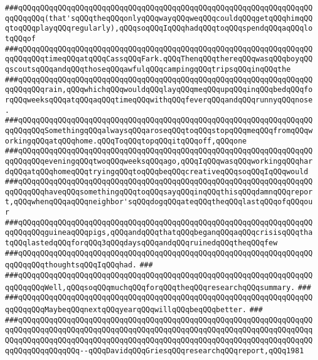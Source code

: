 \verb|###qQQqqQQqqQQqqQQqqQQqqQQqqQQqqQQqqQQqqQQqqQQqqQQqqQQqqQQqqQQqqQQqqQQqqQQqqQQq(that'sqQQqtheqQQqonlyqQQqwayqQQqweqQQqcouldqQQqgetqQQqhimqQQqtoqQQqplayqQQqregularly),qQQqsoqQQqIqQQqhadqQQqtoqQQqspendqQQqaqQQqlotqQQqof|\newline
\verb|###qQQqqQQqqQQqqQQqqQQqqQQqqQQqqQQqqQQqqQQqqQQqqQQqqQQqqQQqqQQqqQQqqQQqqQQqqQQqtimeqQQqatqQQqCassqQQqFark.qQQqThenqQQqthereqQQqwasqQQqboyqQQqscoutsqQQqandqQQqthoseqQQqawfulqQQqcampingqQQqtripsqQQqinqQQqthe|\newline
\verb|###qQQqqQQqqQQqqQQqqQQqqQQqqQQqqQQqqQQqqQQqqQQqqQQqqQQqqQQqqQQqqQQqqQQqqQQqqQQqrain,qQQqwhichqQQqwouldqQQqlayqQQqmeqQQqupqQQqinqQQqbedqQQqforqQQqweeksqQQqatqQQqaqQQqtimeqQQqwithqQQqfeverqQQqandqQQqrunnyqQQqnose.|\newline
\verb|###qQQqqQQqqQQqqQQqqQQqqQQqqQQqqQQqqQQqqQQqqQQqqQQqqQQqqQQqqQQqqQQqqQQqqQQqqQQqSomethingqQQqalwaysqQQqaroseqQQqtoqQQqstopqQQqmeqQQqfromqQQqworkingqQQqatqQQqhome.qQQqToqQQqtopqQQqitqQQqoff,qQQqone|\newline
\verb|###qQQqqQQqqQQqqQQqqQQqqQQqqQQqqQQqqQQqqQQqqQQqqQQqqQQqqQQqqQQqqQQqqQQqqQQqqQQqeveningqQQqtwoqQQqweeksqQQqago,qQQqIqQQqwasqQQqworkingqQQqhardqQQqatqQQqhomeqQQqtryingqQQqtoqQQqbeqQQqcreativeqQQqsoqQQqIqQQqwould|\newline
\verb|###qQQqqQQqqQQqqQQqqQQqqQQqqQQqqQQqqQQqqQQqqQQqqQQqqQQqqQQqqQQqqQQqqQQqqQQqqQQqhaveqQQqsomethingqQQqtoqQQqsayqQQqinqQQqthisqQQqdamnqQQqreport,qQQqwhenqQQqaqQQqneighbor'sqQQqdogqQQqateqQQqtheqQQqlastqQQqofqQQqour|\newline
\verb|###qQQqqQQqqQQqqQQqqQQqqQQqqQQqqQQqqQQqqQQqqQQqqQQqqQQqqQQqqQQqqQQqqQQqqQQqqQQqguineaqQQqpigs,qQQqandqQQqthatqQQqbeganqQQqaqQQqcrisisqQQqthatqQQqlastedqQQqforqQQq3qQQqdaysqQQqandqQQqruinedqQQqtheqQQqfew|\newline
\verb|###qQQqqQQqqQQqqQQqqQQqqQQqqQQqqQQqqQQqqQQqqQQqqQQqqQQqqQQqqQQqqQQqqQQqqQQqqQQqthoughtsqQQqIqQQqhad.|\newline
\verb|###|\newline
\verb|###qQQqqQQqqQQqqQQqqQQqqQQqqQQqqQQqqQQqqQQqqQQqqQQqqQQqqQQqqQQqqQQqqQQqqQQqqQQqWell,qQQqsoqQQqmuchqQQqforqQQqtheqQQqresearchqQQqsummary.|\newline
\verb|###|\newline
\verb|###qQQqqQQqqQQqqQQqqQQqqQQqqQQqqQQqqQQqqQQqqQQqqQQqqQQqqQQqqQQqqQQqqQQqqQQqqQQqMaybeqQQqnextqQQqyearqQQqwillqQQqbeqQQqbetter.|\newline
\verb|###|\newline
\verb|###qQQqqQQqqQQqqQQqqQQqqQQqqQQqqQQqqQQqqQQqqQQqqQQqqQQqqQQqqQQqqQQqqQQqqQQqqQQqqQQqqQQqqQQqqQQqqQQqqQQqqQQqqQQqqQQqqQQqqQQqqQQqqQQqqQQqqQQqqQQqqQQqqQQqqQQqqQQqqQQqqQQqqQQqqQQqqQQqqQQqqQQqqQQqqQQqqQQqqQQqqQQqqQQqqQQqqQQqqQQqqQQq--qQQqDavidqQQqGriesqQQqresearchqQQqreport,qQQq1981|\newline
